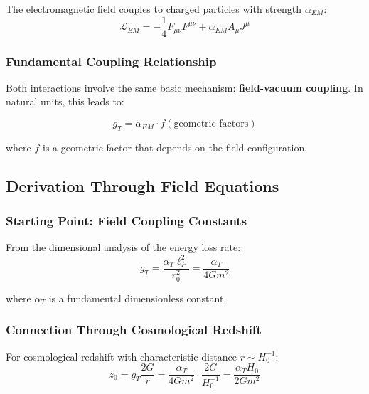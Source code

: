 \documentclass[12pt,a4paper]{article}
\begin{document}
	The electromagnetic field couples to charged particles with strength $\alpha_{EM}$:
	\begin{equation}
		\mathcal{L}_{EM} = -\frac{1}{4} F_{\mu\nu} F^{\mu\nu} + \alpha_{EM} A_\mu J^\mu
	\end{equation}
	
	\subsubsection{Fundamental Coupling Relationship}
	\label{subsubsec:coupling_relationship}
	
	Both interactions involve the same basic mechanism: \textbf{field-vacuum coupling}. In natural units, this leads to:
	
	\begin{equation}
		g_T = \alpha_{EM} \cdot f(\text{geometric factors})
	\end{equation}
	
	where $f$ is a geometric factor that depends on the field configuration.
	
	\subsection{Derivation Through Field Equations}
	\label{subsec:field_equation_derivation}
	
	\subsubsection{Starting Point: Field Coupling Constants}
	\label{subsubsec:field_coupling_constants}
	
	From the dimensional analysis of the energy loss rate:
	\begin{equation}
		g_T = \frac{\alpha_T \ell_P^2}{r_0^2} = \frac{\alpha_T}{4Gm^2}
	\end{equation}
	
	where $\alpha_T$ is a fundamental dimensionless constant.
	
	\subsubsection{Connection Through Cosmological Redshift}
	\label{subsubsec:cosmological_redshift_connection}
	
	For cosmological redshift with characteristic distance $r \sim H_0^{-1}$:
	\begin{equation}
		z_0 = g_T \frac{2G}{r} = \frac{\alpha_T}{4Gm^2} \cdot \frac{2G}{H_0^{-1}} = \frac{\alpha_T H_0}{2Gm^2}
	\end{equation}
	
\end{document}
